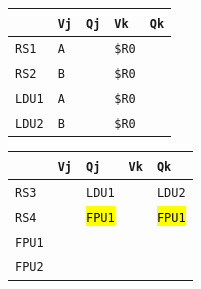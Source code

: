 \begin{enumerate}
    \begin{minipage}{0.45\textwidth}
        \centering
        \begin{tabular}{@{} l | l l l l @{}}
            \toprule
                & \texttt{Vj} & \texttt{Qj} & \texttt{Vk} & \texttt{Qk} \\
            \midrule
            \texttt{RS1} & \texttt{A} & & \texttt{\$R0} & \\ [.3em]
            \texttt{RS2} & \texttt{B} & & \texttt{\$R0} & \\
            \cmidrule{1-5}
            \texttt{LDU1} & \texttt{A} & & \texttt{\$R0} & \\ [.3em]
            \texttt{LDU2} & \texttt{B} & & \texttt{\$R0} & \\
            \bottomrule
        \end{tabular}
    \end{minipage}
    \hfill
    \begin{minipage}{0.45\textwidth}
        \centering
        \begin{tabular}{@{} l | l l l l @{}}
            \toprule
            & \texttt{Vj} & \texttt{Qj} & \texttt{Vk} & \texttt{Qk} \\
            \midrule
            \texttt{RS3} & & \texttt{LDU1} & & \texttt{LDU2} \\ [.3em]
            \texttt{RS4} & & \hl{\texttt{FPU1}} & & \hl{\texttt{FPU1}} \\
            \cmidrule{1-5}
            \texttt{FPU1} & & & & \\ [.3em]
            \texttt{FPU2} & & & & \\
            \bottomrule
        \end{tabular}
    \end{minipage}


\end{enumerate}
